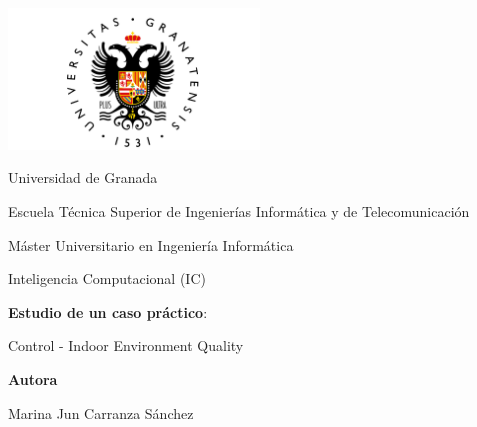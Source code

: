 \documentclass[12pt]{article}
\begin{document}
\begin{titlepage}
    \centering
    \begin{minipage}{1\textwidth}
        \raisebox{-0.7\height}
        {\includegraphics[width=0.5\textwidth]{UGR-Logo}}
    \end{minipage}
   
    \vspace{1.5cm}

    {\LARGE Universidad de Granada \par}
    \vspace{0.3cm}

    {\Large Escuela Técnica Superior de Ingenierías Informática y de Telecomunicación \par}

    \vspace{1cm}
    
    {\Large Máster Universitario en Ingeniería Informática \par}
    
    {\LARGE {Inteligencia Computacional (IC)} \par}
    \vspace{1.5cm}

    {\Huge \textbf{Estudio de un caso práctico}:
    	
	Control - Indoor Environment Quality \par}
    
    \vspace{1.5cm}

    \vfill

    {\Large \textbf{Autora} \par}
    {\Large Marina Jun Carranza Sánchez \par}
    \vspace{0.5cm}
    
\end{titlepage}
\end{document}
